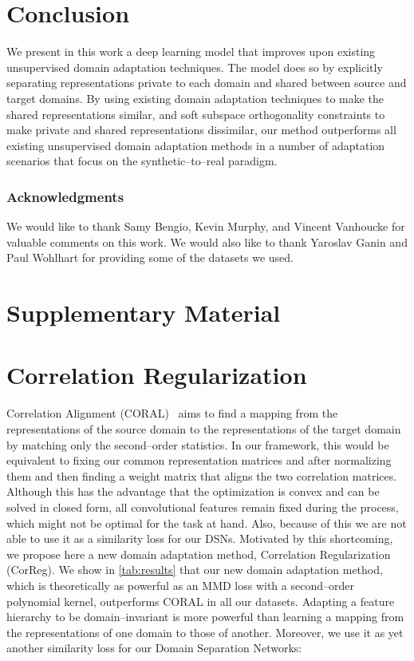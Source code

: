 \documentclass{article}
\begin{document}
 \section{Conclusion}
\label{sec:conclusion}
\vspace{-4mm}
We present in this work a deep learning model that improves upon existing unsupervised domain adaptation techniques. The model does so by explicitly separating representations private to each domain and shared between source and target domains. By using existing domain adaptation techniques to make the shared representations similar, and soft subspace orthogonality constraints to make private and shared representations dissimilar, our method outperforms all existing unsupervised domain adaptation methods in a number of adaptation scenarios that focus on the synthetic--to--real paradigm. %
 
\subsubsection*{Acknowledgments}

We would like to thank Samy Bengio, Kevin Murphy, and Vincent Vanhoucke for valuable comments on this work. We would also like to thank Yaroslav Ganin and Paul Wohlhart for providing some of the datasets we used.

\clearpage
{
\small


}

\clearpage
\section*{Supplementary Material}
\appendix 



\section{Correlation Regularization}
\label{sec:correg}

Correlation Alignment (CORAL)~\cite{sun2015return} aims to find a mapping from the representations of the source domain to the representations of the target domain by matching only the second--order statistics. In our framework, this would be equivalent to fixing our common representation  matrices  and  after normalizing them and then finding a weight matrix  that aligns the two correlation matrices. Although this has the advantage that the optimization
is convex and can be solved in closed form, all convolutional features remain
fixed during the process, which might not be optimal for the task at hand. Also, because of this we are not able to use it as a similarity loss for our DSNs. 
Motivated by this shortcoming, we propose here a new domain adaptation method, Correlation Regularization (CorReg). We show in \autoref{tab:results} that our new domain adaptation method, which is theoretically as powerful as an MMD loss with a second--order polynomial kernel, outperforms CORAL in all our datasets. Adapting a feature hierarchy to be domain--invariant is more powerful than learning a mapping from the representations of one domain to those of another. Moreover, we use it as yet another similarity loss for our Domain Separation Networks:
\end{document}

